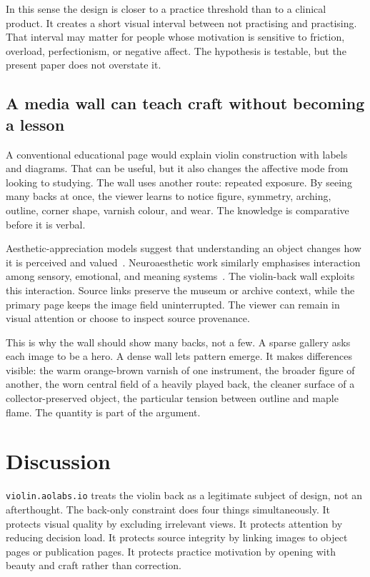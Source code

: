 \documentclass[12pt,letterpaper]{article}
\begin{document}
In this sense the design is closer to a practice threshold than to a clinical product. It creates a short visual interval between not practising and practising. That interval may matter for people whose motivation is sensitive to friction, overload, perfectionism, or negative affect. The hypothesis is testable, but the present paper does not overstate it.

\subsection{A media wall can teach craft without becoming a lesson}

A conventional educational page would explain violin construction with labels and diagrams. That can be useful, but it also changes the affective mode from looking to studying. The wall uses another route: repeated exposure. By seeing many backs at once, the viewer learns to notice figure, symmetry, arching, outline, corner shape, varnish colour, and wear. The knowledge is comparative before it is verbal.

Aesthetic-appreciation models suggest that understanding an object changes how it is perceived and valued~\cite{leder_model_2004}. Neuroaesthetic work similarly emphasises interaction among sensory, emotional, and meaning systems~\cite{chatterjee_neuroaesthetics_2014}. The violin-back wall exploits this interaction. Source links preserve the museum or archive context, while the primary page keeps the image field uninterrupted. The viewer can remain in visual attention or choose to inspect source provenance.

This is why the wall should show many backs, not a few. A sparse gallery asks each image to be a hero. A dense wall lets pattern emerge. It makes differences visible: the warm orange-brown varnish of one instrument, the broader figure of another, the worn central field of a heavily played back, the cleaner surface of a collector-preserved object, the particular tension between outline and maple flame. The quantity is part of the argument.

\section{Discussion}

\texttt{violin.aolabs.io} treats the violin back as a legitimate subject of design, not an afterthought. The back-only constraint does four things simultaneously. It protects visual quality by excluding irrelevant views. It protects attention by reducing decision load. It protects source integrity by linking images to object pages or publication pages. It protects practice motivation by opening with beauty and craft rather than correction.
\end{document}
